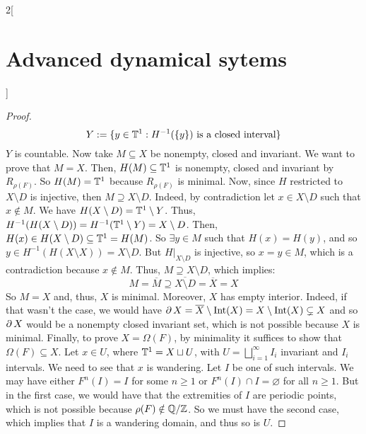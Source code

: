 \documentclass[../../../main_math.tex]{subfiles}
\begin{document}
\begin{multicols}{2}[\section{Advanced dynamical sytems}]
\begin{proof}
    \begin{equation}\label{ADS:eq1}
      Y:=\{y\in\mathbb{T}^1:H^{-1}(\{y\})\text{ is a closed interval}\}
    \end{equation}
    $Y$ is countable. Now take $M\subseteq X$ be nonempty, closed and invariant. We want to prove that $M=X$. Then, $H(M)\subseteq \mathbb{T}^1$ is nonempty, closed and invariant by $R_{\rho(F)}$. So $H(M)=\mathbb{T}^1$ because $R_{\rho(F)}$ is minimal. Now, since $H$ restricted to $X\setminus D$ is injective, then $M\supseteq X\setminus D$. Indeed, by contradiction let $x\in X\setminus D$ such that $x\notin M$. We have $H(X\setminus D)=\mathbb{T}^1\setminus Y$. Thus, $H^{-1}(H(X\setminus D))=H^{-1}(\mathbb{T}^1\setminus Y)=X\setminus D$. Then, $H(x)\in H(X\setminus D)\subseteq \mathbb{T}^1=H(M)$. So $\exists y\in M$ such that $H(x)=H(y)$, and so$y\in H^{-1}(H(X\setminus X))=X\setminus D$. But $H|_{X\setminus D}$ is injective, so $x=y\in M$, which is a contradiction because $x\notin M$. Thus, $M\supseteq X\setminus D$, which implies:
    $$
      M=\overline{M}\supseteq \overline{X\setminus D}=\overline{X} = X
    $$
    So $M=X$ and, thus, $X$ is minimal. Moreover, $X$ has empty interior. Indeed, if that wasn't the case, we would have $\operatorname{\partial}{X}=\overline{X}\setminus\operatorname{Int}(X)=X\setminus \operatorname{Int}(X)\subsetneq X$ and so $\operatorname{\partial}{X}$ would be a nonempty closed invariant set, which is not possible because $X$ is minimal. Finally, to prove $X=\Omega(F)$, by minimality it suffices to show that $\Omega(F)\subseteq X$. Let $x\in U$, where $\mathbb{T}^1=X\sqcup U$, with $U=\bigsqcup_{i=1}^\infty I_i$ invariant and $I_i$ intervals. We need to see that $x$ is wandering. Let $I$ be one of such intervals. We may have either $F^n(I)=I$ for some $n\geq 1$ or $F^n(I)\cap I=\varnothing$ for all $n\geq 1$. But in the first case, we would have that the extremities of $I$ are periodic points, which is not possible because $\rho(F)\notin\quot{\QQ}{\ZZ}$. So we must have the second case, which implies that $I$ is a wandering domain, and thus so is $U$.
  \end{proof}

\end{multicols}
\end{document}
